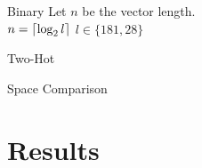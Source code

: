 \documentclass[10pt]{beamer}
\DeclarePairedDelimiter{\ceil}{\lceil}{\rceil}
\begin{document}
\begin{frame}[fragile]{Binary}
Let $n$ be the vector length.\\
$n = \ceil*{\log_2 l}$ $l \in \{181, 28\}$
    \begin{center}
        
    \end{center}
\end{frame}

\begin{frame}[fragile]{Two-Hot}
    \begin{center}
        
    \end{center}
\end{frame}



\begin{frame}[fragile]{Space Comparison}
    \begin{center}
        
    \end{center}
\end{frame}











\section{Results}  
\end{document}
